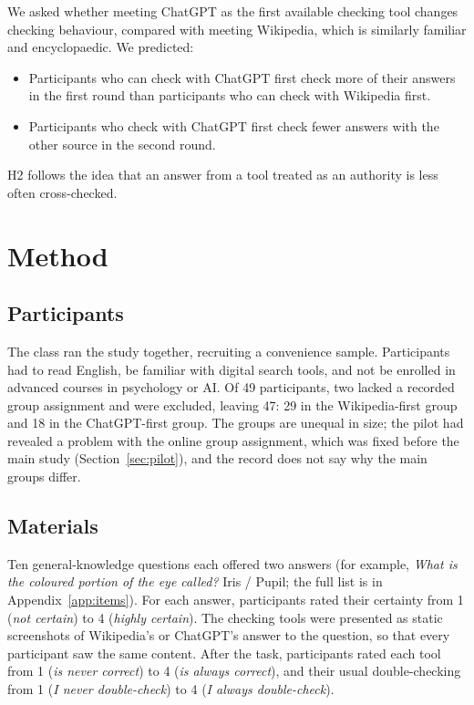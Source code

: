 \documentclass[11pt,a4paper]{article}
\begin{document}
We asked whether meeting ChatGPT as the first available checking tool changes checking behaviour, compared with meeting Wikipedia, which is similarly familiar and encyclopaedic. We predicted:
\begin{itemize}\itemsep0em
\item[\textbf{H1}] Participants who can check with ChatGPT first check more of their answers in the first round than participants who can check with Wikipedia first.
\item[\textbf{H2}] Participants who check with ChatGPT first check fewer answers with the other source in the second round.
\end{itemize}
H2 follows the idea that an answer from a tool treated as an authority is less often cross-checked.

\section{Method}
\subsection{Participants}
The class ran the study together, recruiting a convenience sample. Participants had to read English, be familiar with digital search tools, and not be enrolled in advanced courses in psychology or AI. Of 49 participants, two lacked a recorded group assignment and were excluded, leaving 47: 29 in the Wikipedia-first group and 18 in the ChatGPT-first group. The groups are unequal in size; the pilot had revealed a problem with the online group assignment, which was fixed before the main study (Section~\ref{sec:pilot}), and the record does not say why the main groups differ.

\subsection{Materials}
Ten general-knowledge questions each offered two answers (for example, \emph{What is the coloured portion of the eye called?} Iris / Pupil; the full list is in Appendix~\ref{app:items}). For each answer, participants rated their certainty from 1 (\emph{not certain}) to 4 (\emph{highly certain}). The checking tools were presented as static screenshots of Wikipedia's or ChatGPT's answer to the question, so that every participant saw the same content. After the task, participants rated each tool from 1 (\emph{is never correct}) to 4 (\emph{is always correct}), and their usual double-checking from 1 (\emph{I never double-check}) to 4 (\emph{I always double-check}).
\end{document}
